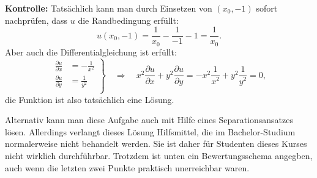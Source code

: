 \begin{loesung}
{\bf Kontrolle:}
Tatsächlich kann man durch Einsetzen von $(x_0,-1)$ sofort nachprüfen,
dass $u$ die Randbedingung erfüllt:
\[
u(x_0,-1)=\frac1{x_0}-\frac1{-1}-1=\frac1{x_0}.
\]
Aber auch die Differentialgleichung ist erfüllt:
\[
\left.
\begin{aligned}
\frac{\partial u}{\partial x}&=-\frac1{x^2}\\
\frac{\partial u}{\partial y}&=\frac1{y^2}\\
\end{aligned}
\right\}
\quad\Rightarrow\quad
x^2\frac{\partial u}{\partial x}+y^2\frac{\partial u}{\partial y}
=
-x^2\frac1{x^2}+y^2\frac1{y^2}
=
0,
\]
die Funktion ist also tatsächlich eine Lösung.

\medskip

Alternativ kann man diese Aufgabe auch mit Hilfe eines Separationsansatzes
lösen. Allerdings verlangt dieses Lösung Hilfsmittel, die im Bachelor-Studium
normalerweise nicht behandelt werden. Sie ist daher für Studenten dieses
Kurses nicht wirklich durchführbar. Trotzdem ist unten ein Bewertungsschema
angegben, auch wenn die letzten zwei Punkte praktisch unerreichbar waren.

\medskip


\end{loesung}
